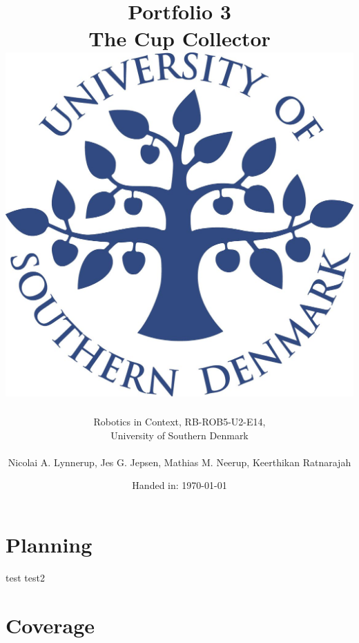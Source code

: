 

\title{\Huge Portfolio 3\\
\small The Cup Collector\\
\vspace{1.5cm}
\includegraphics[scale=1]{sdu}
\vspace{1cm}
}
\author{
	Robotics in Context, RB-ROB5-U2-E14,\\
	University of Southern Denmark\\\ \\
	Nicolai A. Lynnerup, Jes G. Jepsen, Mathias M. Neerup, Keerthikan Ratnarajah
}
\date{	
	Handed in: \today
}
\maketitle


\thispagestyle{empty}
\addtocounter{page}{-1}

\newpage
\thispagestyle{empty}
\tableofcontents


\addtocounter{page}{-1}
\newpage
\chapter{Planning}
test
test2
\chapter{Coverage}
